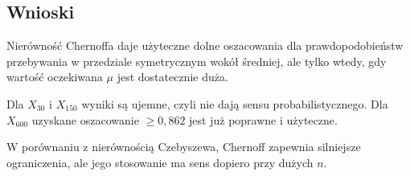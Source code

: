 \documentclass{article}
\begin{document}
\subsection*{Wnioski}

Nierówność Chernoffa daje użyteczne dolne oszacowania dla prawdopodobieństw przebywania w przedziale symetrycznym wokół średniej, ale tylko wtedy, gdy wartość oczekiwana \( \mu \) jest dostatecznie duża.

Dla \( X_{30} \) i \( X_{150} \) wyniki są ujemne, czyli nie dają sensu probabilistycznego. Dla \( X_{600} \) uzyskane oszacowanie \( \geq 0{,}862 \) jest już poprawne i użyteczne.

W porównaniu z nierównością Czebyszewa, Chernoff zapewnia silniejsze ograniczenia, ale jego stosowanie ma sens dopiero przy dużych \( n \).
\end{document}
